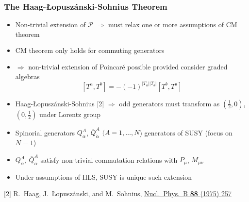 \documentclass[10pt,aspectratio=169]{beamer}
\begin{document}
\begin{frame}
  \frametitle{The Haag-{\L}opusz\'{a}nski-Sohnius Theorem}
  \begin{itemize}\itemsep1em
  \item Non-trivial extension of $\mathcal{P}$ $\Rightarrow$ must
    relax one or more assumptions of CM theorem
  \item {\color{blue} CM theorem only holds for commuting generators}
  \item $\Rightarrow$ non-trivial extension of Poincar\'{e}
    possible provided consider graded algebras
    \begin{equation*}
      \left [ T^a , T^b \right ] = -(-1)^{|T_a||T_b|} \left [
        T^b, T^a \right ]
    \end{equation*}
  \item Haag-{\L}opusz\'{a}nski-Sohnius [2] $\Rightarrow$ odd
    generators must transform as $(\frac{1}{2}, 0)$, $(0, \frac{1}{2})$
    under Lorentz group
  \item Spinorial generators $Q^A_\alpha$, $\overline{Q}^A_{\dot{\alpha}}$
    $(A = 1, \ldots, N$) generators of SUSY (focus on $N = 1$)
  \item $Q^A_\alpha$, $\overline{Q}^A_{\dot{\alpha}}$ satisfy non-trivial
    commutation relations with $P_\mu$, $M_{\mu\nu}$
  \item {\color{blue} Under assumptions of HLS, SUSY is unique such
    extension}
  \end{itemize}
      {\tiny [2] R.~Haag, J.~{\L}opusz\'{a}nski, and M.~Sohnius,
        \href{http://dx.doi.org/10.1016/0550-3213(75)90279-5}{%
        Nucl.~Phys.~B \textbf{88} (1975) 257}}
\end{frame}
\end{document}
